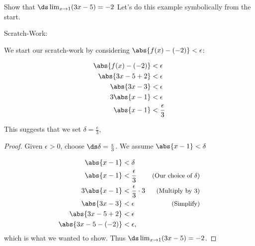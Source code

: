 \begin{example}\label{ex_compute_limNew7}
Show that $\ds \lim_{x\to 1}(3x-5)=-2$
\solution
Let's do this example symbolically from the start.

Scratch-Work:

We start our scratch-work by considering $\abs{f(x)-(-2)}<\epsilon$:

\begin{align*}
\abs{f(x)-(-2)}&<\epsilon \\
\abs{3x-5+2}&<\epsilon \\
\abs{3x-3}&<\epsilon\\
3\abs{x-1}&<\epsilon \\
\abs{x-1}&<\frac{\epsilon}{3}\\
\end{align*}

This suggests that we set $\delta=\frac{\epsilon}{3}$,

\begin{proof}
Given $\epsilon>0$, choose $\ds \delta=\frac{\epsilon}{3}$. We assume $\abs{x-1}<\delta$

\small
\begin{align*}
\abs{x - 1} &< \delta &\\
\abs{x - 1} &< \frac{\epsilon}{3}&  \text{\small(Our choice of $\delta$)}\\
3\abs{x - 1} &< \frac{\epsilon}{3}\cdot 3 &  \text{\small(Multiply by 3)}\\
\abs{3x-3}&< \epsilon &  \text{\small(Simplify)}\\
\abs{3x-5+2}&< \epsilon & \\
\abs{3x-5-(-2)}&< \epsilon, &
\end{align*}
\normalsize
which is what we wanted to show. Thus  $\ds \lim_{x\to 1}(3x-5)=-2$.\qedhere
\end{proof}
\end{example}

